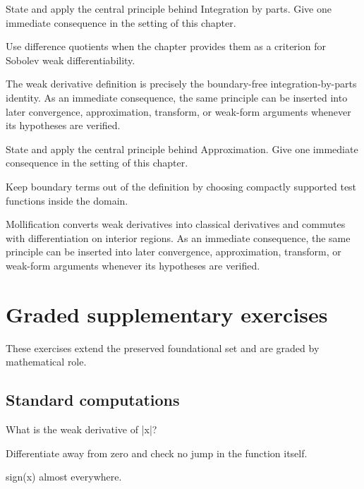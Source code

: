 \begin{exercise}\label{exr:iii20-07}
State and apply the central principle behind Integration by parts. Give one immediate consequence in the setting of this chapter.
\end{exercise}
\begin{hint}
Use difference quotients when the chapter provides them as a criterion for Sobolev weak differentiability.
\end{hint}
\begin{solution}
The weak derivative definition is precisely the boundary-free integration-by-parts identity. As an immediate consequence, the same principle can be inserted into later convergence, approximation, transform, or weak-form arguments whenever its hypotheses are verified.
\end{solution}

\begin{exercise}\label{exr:iii20-08}
State and apply the central principle behind Approximation. Give one immediate consequence in the setting of this chapter.
\end{exercise}
\begin{hint}
Keep boundary terms out of the definition by choosing compactly supported test functions inside the domain.
\end{hint}
\begin{solution}
Mollification converts weak derivatives into classical derivatives and commutes with differentiation on interior regions. As an immediate consequence, the same principle can be inserted into later convergence, approximation, transform, or weak-form arguments whenever its hypotheses are verified.
\end{solution}


\section{Graded supplementary exercises}
These exercises extend the preserved foundational set and are graded by mathematical role.

\subsection*{Standard computations}

\begin{exercise}\label{exr:iii20-expand-01}
What is the weak derivative of |x|?
\end{exercise}
\begin{hint}
Differentiate away from zero and check no jump in the function itself.
\end{hint}
\begin{solution}
sign(x) almost everywhere.
\end{solution}

